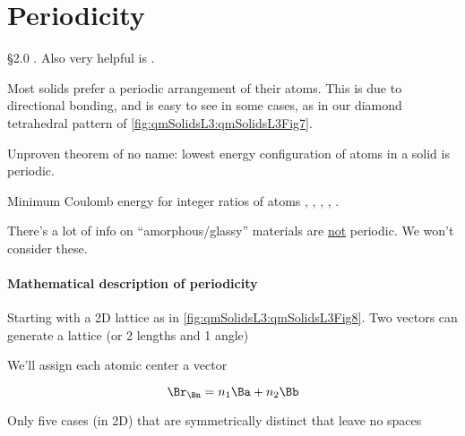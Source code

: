 %
%
\section{Periodicity}

\reading \S 2.0 \citep{ibach2009solid}.  Also very helpful is \citep{tung:bravais}.

Most solids prefer a periodic arrangement of their atoms.  This is due to directional bonding, and is easy to see in some cases, as in our diamond tetrahedral pattern of \cref{fig:qmSolidsL3:qmSolidsL3Fig7}.


Unproven theorem of no name: lowest energy configuration of atoms in a solid is periodic.

Minimum Coulomb energy for integer ratios of atoms
,
,
,
,
.

There's a lot of info on ``amorphous/glassy'' materials are \underline{not} periodic.  We won't consider these.

\paragraph{Mathematical description of periodicity}

Starting with a 2D lattice as in \cref{fig:qmSolidsL3:qmSolidsL3Fig8}.  Two vectors can generate a lattice (or 2 lengths and 1 angle)


We'll assign each atomic center a vector

\begin{dmath}\label{eqn:condensedMatterLecture3:100}
\Br_\Bn = n_1 \Ba + n_2 \Bb
\end{dmath}

Only five cases (in 2D) that are symmetrically distinct that leave no spaces


